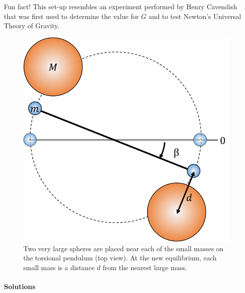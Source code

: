 \begin{framed}
Fun fact! This set-up resembles an experiment performed by Henry Cavendish that was first used to determine the value for $G$ and to test Newton's Universal Theory of Gravity.

\begin{figure}[!htbp]
\centering
\includegraphics[width=0.4\linewidth]{files/torsionalpendulum2-ff2f313312974ebee0e8d1ecd462646c.png}
\caption[]{Two very large spheres are placed near each of the small masses on the torsional pendulum (top view). At the new equilibrium, each small mass is a distance $d$ from the nearest large mass.}
\label{fig:simpleharmonicmotion:torsional2}
\end{figure}
\end{framed}

\paragraph{Solutions}

